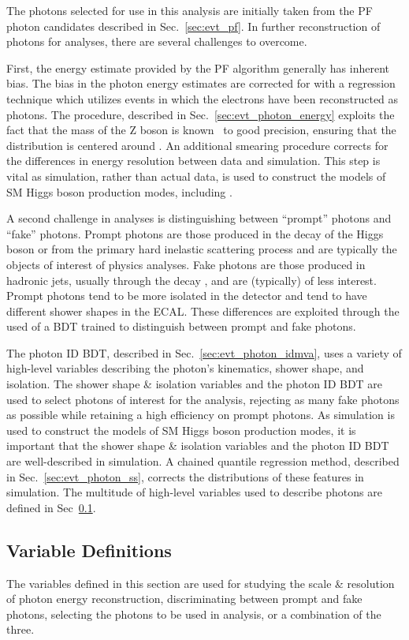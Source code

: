The photons selected for use in this analysis are initially taken from the PF photon candidates described in Sec.~\ref{sec:evt_pf}.
In further reconstruction of photons for \Hgg analyses, there are several challenges to overcome.

First, the energy estimate provided by the PF algorithm generally has inherent bias.
The bias in the photon energy estimates are corrected for with a regression technique which utilizes \Zee events in which the electrons have been reconstructed as photons.
The procedure, described in Sec.~\ref{sec:evt_photon_energy} exploits the fact that the mass of the Z boson is known~\cite{Tanabashi:2018oca} to good precision, ensuring that the \mee distribution is centered around \mZ.
An additional smearing procedure corrects for the differences in energy resolution between data and simulation.
This step is vital as simulation, rather than actual data, is used to construct the models of SM Higgs boson production modes, including \ttH.

A second challenge in \Hgg analyses is distinguishing between ``prompt'' photons and ``fake'' photons.
Prompt photons are those produced in the decay of the Higgs boson or from the primary hard inelastic scattering process and are typically the objects of interest of physics analyses.
Fake photons are those produced in hadronic jets, usually through the decay \Pigg, and are (typically) of less interest.
Prompt photons tend to be more isolated in the detector and tend to have different shower shapes in the ECAL.
These differences are exploited through the used of a BDT trained to distinguish between prompt and fake photons.

The photon ID BDT, described in Sec.~\ref{sec:evt_photon_idmva}, uses a variety of high-level variables describing the photon's kinematics, shower shape, and isolation.
The shower shape \& isolation variables and the photon ID BDT are used to select photons of interest for the \ttH analysis, rejecting as many fake photons as possible while retaining a high efficiency on prompt photons.
As simulation is used to construct the models of SM Higgs boson production modes, it is important that the shower shape \& isolation variables and the photon ID BDT are well-described in simulation.
A chained quantile regression method, described in Sec.~\ref{sec:evt_photon_ss}, corrects the distributions of these features in simulation.
The multitude of high-level variables used to describe photons are defined in Sec~\ref{sec:evt_photon_vardef}.
 
\subsection{Variable Definitions} \label{sec:evt_photon_vardef}
The variables defined in this section are used for studying the scale \& resolution of photon energy reconstruction, discriminating between prompt and fake photons, selecting the photons to be used in analysis, or a combination of the three.

